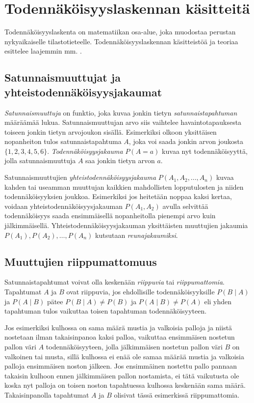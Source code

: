 \section{Todennäköisyyslaskennan käsitteitä} 

Todennäköisyyslaskenta on matematiikan osa-alue, joka muodostaa perustan nykyaikaiselle tilastotieteelle. Todennäköisyyslaskennan käsitteistöä ja teoriaa esittelee laajemmin mm. \citet{dasgupta_probability_2011}. 

\subsection{Satunnaismuuttujat ja yhteistodennäköisyysjakaumat} 

\emph{Satunnaismuuttuja} on funktio, joka kuvaa jonkin tietyn \emph{satunnaistapahtuman} määräämää lukua. Satunnaismuuttujan arvo siis vaihtelee havaintotapauksesta toiseen jonkin tietyn arvojoukon sisällä. Esimerkiksi olkoon yksittäisen nopanheiton tulos satunnaistapahtuma $A$, joka voi saada jonkin arvon joukosta $\{1,2,3,4,5,6\}$. \emph{Todennäköisyysjakauma} $P(A=a)$ kuvaa nyt todennäköisyyttä, jolla satunnaismuuttuja $A$ saa jonkin tietyn arvon $a$. 

Satunnaismuuttujien \emph{yhteistodennäköisyysjakauma} $P(A_1, A_2, \ldots ,A_n)$ kuvaa kahden tai useamman muuttujan kaikkien mahdollisten lopputulosten ja niiden todennäköisyyksien joukkoa. Esimerkiksi jos heitetään noppaa kaksi kertaa, voidaan yhteistodennäköisyysjakauman $P(A_1, A_2)$ avulla selvittää todennäköisyys saada ensimmäisellä nopanheitolla pienempi arvo kuin jälkimmäisellä. Yhteistodennäköisyysjakauman yksittäisten muuttujien jakaumia $P(A_1), P(A_2),\dots, P(A_n)$ kutsutaan \emph{reunajakaumiksi}. 

\subsection{Muuttujien riippumattomuus} 

Satunnaistapahtumat voivat olla keskenään \emph{riippuvia} tai \emph{riippumattomia}. Tapahtumat $A$ ja $B$ ovat riippuvia, jos ehdollisille todennäköisyyksille $P(B \mid A)$ ja $P(A \mid B)$ pätee $P(B \mid A) \not= P(B)$ ja $P(A \mid B) \not= P(A)$ eli yhden tapahtuman tulos vaikuttaa toisen tapahtuman todennäköisyyteen. 

Jos esimerkiksi kulhossa on sama määrä mustia ja valkoisia palloja ja niistä nostetaan ilman takaisinpanoa kaksi palloa, vaikuttaa ensimmäisen nostetun pallon väri $A$ todennäköisyyteen, jolla jälkimmäisen nostetun pallon väri $B$ on valkoinen tai musta, sillä kulhossa ei enää ole samaa määrää mustia ja valkoisia palloja ensimmäisen noston jälkeen. Jos ensimmäinen nostettu pallo pannaan takaisin kulhoon ennen jälkimmäisen pallon nostamista, ei tätä vaikutusta ole koska nyt palloja on toisen noston tapahtuessa kulhossa keskenään sama määrä. Takaisinpanolla tapahtumat $A$ ja $B$ olisivat tässä esimerkissä riippumattomia.  


